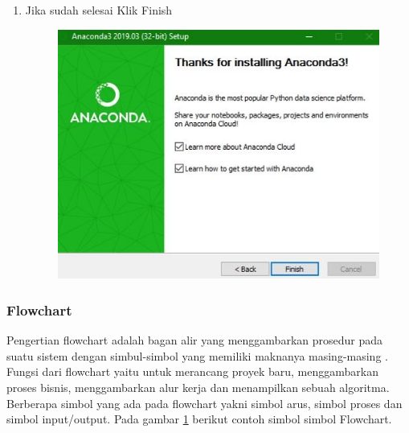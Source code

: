 \begin{enumerate}
    \item Jika sudah selesai Klik Finish
    \begin{figure}[!htbp]
        \centering
        \includegraphics[scale=0.6]{figure/Anaconda/8.jpeg}
        \label{gambar 1}
    \end{figure}
\end{enumerate}
    \vspace{1cm}
\subsubsection{Flowchart}
Pengertian flowchart adalah bagan alir yang menggambarkan prosedur pada suatu sistem dengan simbul-simbol yang memiliki maknanya masing-masing \cite{solikin2018implementasi}. Fungsi dari flowchart yaitu untuk merancang proyek baru, menggambarkan proses bisnis, menggambarkan alur kerja dan menampilkan sebuah algoritma. Berberapa simbol yang ada pada flowchart yakni simbol arus, simbol proses dan simbol input/output. Pada gambar \ref{gambar 1} berikut contoh simbol simbol Flowchart.

